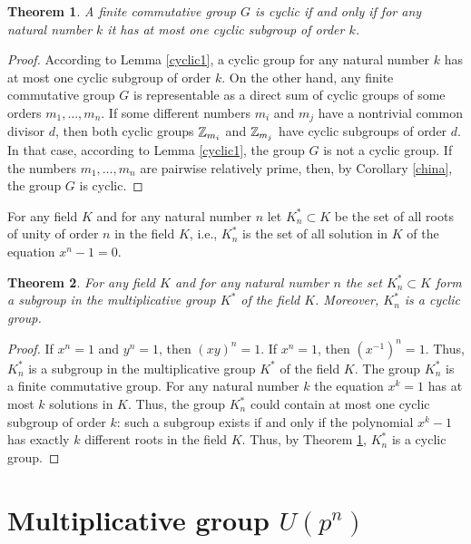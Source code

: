 \documentclass[11pt]{article}
\theoremstyle{plain}
\newtheorem{theorem}{Theorem}[section]
\theoremstyle{definition}
\begin{document}
\begin{theorem}\label{cyclic2} A finite commutative  group $G$ is cyclic if and only if for any natural number  $k$ it has  at most one cyclic subgroup of order $k$.
\end{theorem}

\begin{proof} According to Lemma \ref{cyclic1}, a cyclic group  for any  natural number $k$ has at most one cyclic subgroup of order $k$.
On the other hand, any finite  commutative group $G$ is representable as a direct sum of cyclic groups of some orders $m_1,\dots,m_n$. If some different  numbers $m_i$ and $m_j$ have a nontrivial common
divisor $d$, then both cyclic groups $\Bbb Z_{m_i}$ and $\Bbb Z_{m_j}$ have cyclic subgroups of order $d$. In that case, according to Lemma \ref{cyclic1}, the group $G$ is not a cyclic group. If the numbers $m_1,\dots, m_n$ are pairwise relatively  prime, then, by Corollary \ref{china}, the group $G$ is cyclic.
\end{proof}

For any field $K$ and for any natural number $n$ let $K^*_n\subset K$ be the set of all roots of unity of order $n$ in the field $K$, i.e., $K^*_n$ is the set  of all solution in $K$ of the equation  $x^n-1=0$.

\begin{theorem} For any field $K$  and for any natural number $n$ the set $K^*_n \subset K$ form a subgroup in the  multiplicative group $K^*$ of the field $K$. Moreover,  $K^*_n$ is a cyclic group.
\end{theorem}

\begin{proof} If $x^n=1$ and $y^n=1$, then $(xy)^n=1$. If $x^n=1$, then $(x^{-1})^n=1$. Thus, $K^*_n$ is a subgroup in the  multiplicative group $K^*$ of the field $K$.
The group $K^*_n$ is a finite commutative group. For any natural number $k$  the equation $x^k=1$ has  at most $k$ solutions in $K$. Thus, the group $K^*_n$ could contain at most one cyclic subgroup of order $k$: such a subgroup exists if and only if the polynomial $x^k-1$ has exactly $k$ different roots in the field $K$.  Thus, by Theorem \ref{cyclic2},  $K^*_n$ is a cyclic group.
\end{proof}

\section{Multiplicative  group $U(p^n)$}\label{u}
\end{document}
